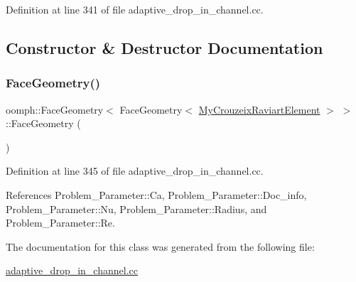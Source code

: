 Definition at line 341 of file adaptive\+\_\+drop\+\_\+in\+\_\+channel.\+cc.



\subsection{Constructor \& Destructor Documentation}
\mbox{\label{classoomph_1_1FaceGeometry_3_01FaceGeometry_3_01MyCrouzeixRaviartElement_01_4_01_4_ace1479da1535c271d7dc671dacbbdcca}} 
\subsubsection{\texorpdfstring{Face\+Geometry()}{FaceGeometry()}}
{\footnotesize\ttfamily oomph\+::\+Face\+Geometry$<$ Face\+Geometry$<$ \hyperlink{classoomph_1_1MyCrouzeixRaviartElement}{My\+Crouzeix\+Raviart\+Element} $>$ $>$\+::Face\+Geometry (\begin{DoxyParamCaption}{ }\end{DoxyParamCaption})\hspace{0.3cm}{\ttfamily [inline]}}



Definition at line 345 of file adaptive\+\_\+drop\+\_\+in\+\_\+channel.\+cc.



References Problem\+\_\+\+Parameter\+::\+Ca, Problem\+\_\+\+Parameter\+::\+Doc\+\_\+info, Problem\+\_\+\+Parameter\+::\+Nu, Problem\+\_\+\+Parameter\+::\+Radius, and Problem\+\_\+\+Parameter\+::\+Re.



The documentation for this class was generated from the following file\+:\begin{DoxyCompactItemize}
\item 
\hyperlink{adaptive__drop__in__channel_8cc}{adaptive\+\_\+drop\+\_\+in\+\_\+channel.\+cc}\end{DoxyCompactItemize}
